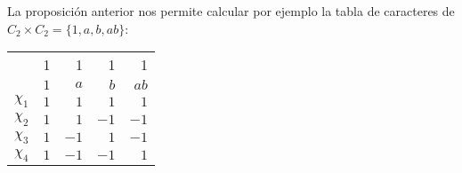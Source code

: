 

\begin{example}
	La proposición anterior nos permite calcular por ejemplo
	la tabla de caracteres de $C_2\times C_2=\{1,a,b,ab\}$:
	\begin{center}
		\begin{tabular}{|c|rrrr|}
			\hline 
			& 1 & 1 & 1 & 1\tabularnewline
			& $1$ & $a$ & $b$ & $ab$\tabularnewline
			\hline 
			$\chi_{1}$ & $1$ & $1$ & $1$ & $1$\tabularnewline
			$\chi_{2}$ & $1$ & $1$ & $-1$ & $-1$\tabularnewline
			$\chi_{3}$ & $1$ & $-1$ & $1$ & $-1$\tabularnewline
			$\chi_{4}$ & $1$ & $-1$ & $-1$ & $1$\tabularnewline
			\hline
		\end{tabular}
	\end{center}
\end{example}

